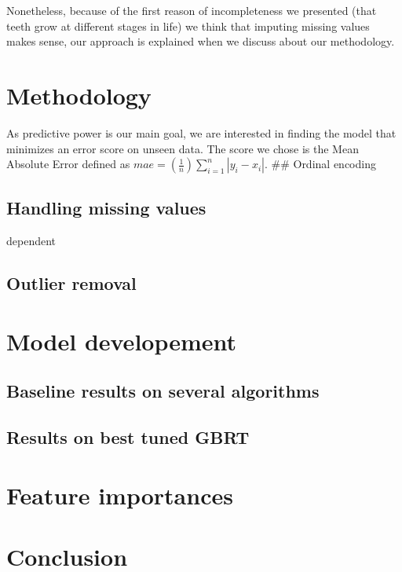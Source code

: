 \documentclass[11pt,]{article}
\begin{document}
Nonetheless, because of the first reason of incompleteness we presented
(that teeth grow at different stages in life) we think that imputing
missing values makes sense, our approach is explained when we discuss
about our methodology.

\hypertarget{methodology}{%
\section{Methodology}\label{methodology}}

As predictive power is our main goal, we are interested in finding the
model that minimizes an error score on unseen data. The score we chose
is the Mean Absolute Error defined as
\(mae=(\frac{1}{n})\sum_{i=1}^{n}\left | y_{i} - x_{i} \right |\). \#\#
Ordinal encoding

\hypertarget{handling-missing-values}{%
\subsection{Handling missing values}\label{handling-missing-values}}

dependent \textcite{Kontopantelis2017}

\hypertarget{outlier-removal}{%
\subsection{Outlier removal}\label{outlier-removal}}

\hypertarget{model-developement}{%
\section{Model developement}\label{model-developement}}

\hypertarget{baseline-results-on-several-algorithms}{%
\subsection{Baseline results on several
algorithms}\label{baseline-results-on-several-algorithms}}

\hypertarget{results-on-best-tuned-gbrt}{%
\subsection{Results on best tuned
GBRT}\label{results-on-best-tuned-gbrt}}

\hypertarget{feature-importances}{%
\section{Feature importances}\label{feature-importances}}

\hypertarget{conclusion}{%
\section{Conclusion}\label{conclusion}}





\newpage
\singlespacing 
\printbibliography[title=References]
\end{document}
